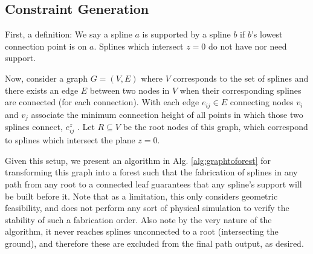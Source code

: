 \documentclass[conference]{acmsiggraph}
\begin{document}
\subsection{Constraint Generation}

First, a definition: We say a spline $a$ is supported by a spline $b$ if $b$'s lowest connection point is on $a$.  Splines which intersect $z=0$ do not have nor need support.

Now, consider a graph $G = (V, E)$ where $V$ corresponds to the set of splines and there exists an edge $E$ between two nodes in $V$ when their corresponding splines are connected (for each connection).  With each edge $e_{ij} \in E$ connecting nodes $v_i$ and $v_j$ associate the minimum connection height of all points in which those two splines connect, $e_{ij}^z$
.  Let $R \subseteq V$ be the root nodes of this graph, which correspond to splines which intersect the plane $z=0$.



Given this setup, we present an algorithm in Alg. \ref{alg:graphtoforest} for transforming this graph into a forest such that the fabrication of splines in any path from any root to a connected leaf guarantees that any spline's support will be built before it.  Note that as a limitation, this only considers geometric feasibility, and does not perform any sort of physical simulation to verify the stability of such a fabrication order.  Also note by the very nature of the algorithm, it never reaches splines unconnected to a root (intersecting the ground), and therefore these are excluded from the final path output, as desired.
\end{document}
